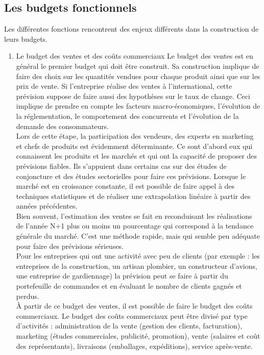 \documentclass{tufte-handout}
\begin{document}
\subsection{Les budgets fonctionnels}
\label{sec:org13b7846}
Les différentes fonctions rencontrent des enjeux différents dans la construction de leurs budgets.\\
\begin{enumerate}
\item Le budget des ventes et des coûts commerciaux
\label{sec:org5ab4d43}
Le budget des ventes est en général le premier budget qui doit être construit. Sa construction implique de faire des choix sur les quantités vendues pour chaque produit ainsi que sur les prix de vente. Si l'entreprise réalise des ventes à l'international, cette prévision suppose de faire aussi des hypothèses sur le taux de change. Ceci implique de prendre en compte les facteurs macro-économiques, l'évolution de la réglementation, le comportement des concurrents et l'évolution de la demande des consommateurs.\\
Lors de cette étape, la participation des vendeurs, des experts en marketing et chefs de produits est évidemment déterminante. Ce sont d'abord eux qui connaissent les produits et les marchés et qui ont la capacité de proposer des prévisions fiables. Ils s'appuient dans certains cas sur des études de conjoncture et des études sectorielles pour faire ces prévisions. Lorsque le marché est en croissance constante, il est possible de faire appel à des techniques statistiques et de réaliser une extrapolation linéaire à partir des années précédentes.\\
Bien souvent, l'estimation des ventes se fait en reconduisant les réalisations de l'année N+1 plus ou moins un pourcentage qui correspond à la tendance générale du marché. C'est une méthode rapide, mais qui semble peu adéquate pour faire des prévisions sérieuses.\\
Pour les entreprises qui ont une activité avec peu de clients (par exemple : les entreprises de la construction, un artisan plombier, un constructeur d'avions, une entreprise de gardiennage) la prévision peut se faire à partir du portefeuille de commandes et en évaluant le nombre de clients gagnés et perdus.\\
À partir de ce budget des ventes, il est possible de faire le budget des coûts commerciaux. Le budget des coûts commerciaux peut être divisé par type d'activités : administration de la vente (gestion des clients, facturation), marketing (études commerciales, publicité, promotion), vente (salaires et coût des représentants), livraisons (emballages, expéditions), service après-vente.\\

\end{enumerate}
\end{document}
